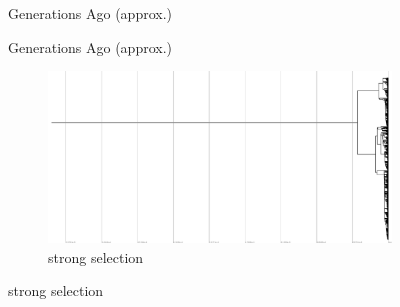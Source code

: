 \begin{figure}
  \begin{minipage}{0.48\textwidth}
    \centering
    Generations Ago (approx.)
  \end{minipage}
  \hfill
  \begin{minipage}{0.48\textwidth}
    \centering
    Generations Ago (approx.)
  \end{minipage}
  \begin{minipage}{0.48\textwidth}
    \hspace{0.02\linewidth}
    \hfill
    \hfill
    \hfill
    \hfill
  \end{minipage}
  \hfill
  \begin{minipage}{0.48\textwidth}
    \hspace{0.02\linewidth}
    \hfill
    \hfill
    \hfill
    \hfill
  \end{minipage}
  \hfill
  \begin{subfigure}[b]{0.48\textwidth}
    \includegraphics[height=0.12\textheight,width=\textwidth]{img/perfect-tree-phylogenies-log/epoch=7+resolution=3+treatment=2.pdf}
    \caption{%
      strong selection}

\end{subfigure}
\end{figure}
